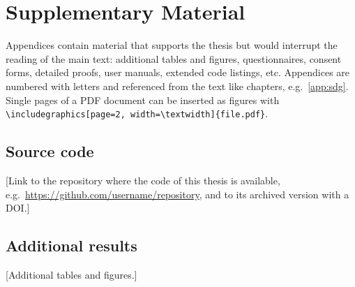 \chapter{Supplementary Material}\label{app:supplementary}

\begin{guidance}
Appendices contain material that supports the thesis but would interrupt the reading of
the main text: additional tables and figures, questionnaires, consent forms, detailed
proofs, user manuals, extended code listings, etc. Appendices are numbered with letters
and referenced from the text like chapters, e.g.\ \autoref{app:sdg}. Single pages of a PDF
document can be inserted as figures with \texttt{\textbackslash includegraphics[page=2,
width=\textbackslash textwidth]\{file.pdf\}}.
\end{guidance}

\section{Source code}\label{sec:app-code}

[Link to the repository where the code of this thesis is available, e.g.\
\url{https://github.com/username/repository}, and to its archived version with a
DOI.]

\section{Additional results}\label{sec:app-results}

[Additional tables and figures.]
